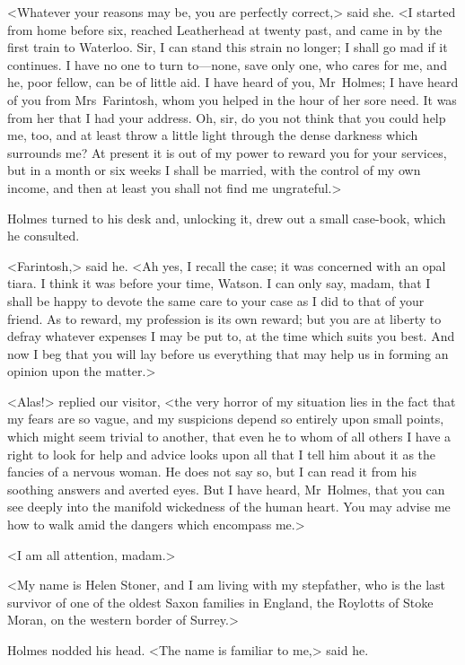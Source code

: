 <Whatever your reasons may be, you are perfectly correct,> said she. <I started from home before six, reached Leatherhead at twenty past, and came in by the first train to Waterloo. Sir, I can stand this strain no longer; I shall go mad if it continues. I have no one to turn to—none, save only one, who cares for me, and he, poor fellow, can be of little aid. I have heard of you, Mr~Holmes; I have heard of you from Mrs~Farintosh, whom you helped in the hour of her sore need. It was from her that I had your address. Oh, sir, do you not think that you could help me, too, and at least throw a little light through the dense darkness which surrounds me? At present it is out of my power to reward you for your services, but in a month or six weeks I shall be married, with the control of my own income, and then at least you shall not find me ungrateful.>

Holmes turned to his desk and, unlocking it, drew out a small case-book, which he consulted.

<Farintosh,> said he. <Ah yes, I recall the case; it was concerned with an opal tiara. I think it was before your time, Watson. I can only say, madam, that I shall be happy to devote the same care to your case as I did to that of your friend. As to reward, my profession is its own reward; but you are at liberty to defray whatever expenses I may be put to, at the time which suits you best. And now I beg that you will lay before us everything that may help us in forming an opinion upon the matter.>

<Alas!> replied our visitor, <the very horror of my situation lies in the fact that my fears are so vague, and my suspicions depend so entirely upon small points, which might seem trivial to another, that even he to whom of all others I have a right to look for help and advice looks upon all that I tell him about it as the fancies of a nervous woman. He does not say so, but I can read it from his soothing answers and averted eyes. But I have heard, Mr~Holmes, that you can see deeply into the manifold wickedness of the human heart. You may advise me how to walk amid the dangers which encompass me.>

<I am all attention, madam.>

<My name is Helen Stoner, and I am living with my stepfather, who is the last survivor of one of the oldest Saxon families in England, the Roylotts of Stoke Moran, on the western border of Surrey.>

Holmes nodded his head. <The name is familiar to me,> said he.

